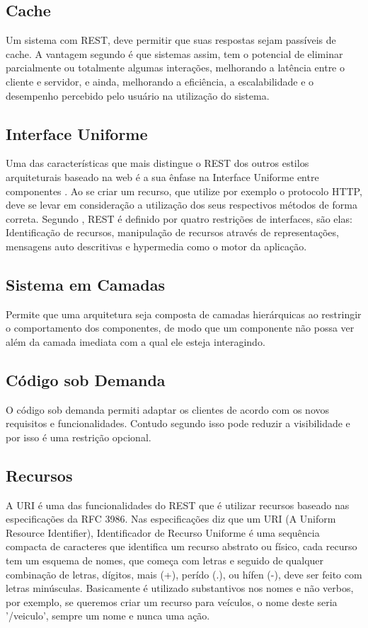 \subsection{Cache}
Um sistema com REST, deve permitir que suas respostas sejam passíveis de cache. A vantagem segundo \cite{royFielding} é que sistemas assim, tem o potencial de eliminar parcialmente ou totalmente algumas interações, melhorando a latência entre o cliente e servidor, e ainda, melhorando a eficiência, a escalabilidade e o desempenho percebido pelo usuário na utilização do sistema.

\subsection{Interface Uniforme}
Uma das características que mais distingue o REST dos outros estilos arquiteturais baseado na web é a sua ênfase na Interface Uniforme entre componentes \cite{royFielding}. Ao se criar um recurso, que utilize por exemplo o protocolo HTTP, deve se levar em consideração a utilização dos seus respectivos métodos de forma correta. Segundo \cite{royFielding}, REST é definido por quatro restrições de interfaces, são elas: Identificação de recursos, manipulação de recursos através de representações, mensagens auto descritivas e hypermedia como o motor da aplicação.

\subsection{Sistema em Camadas}
Permite que uma arquitetura seja composta de camadas hierárquicas ao restringir o comportamento dos componentes, de modo que um componente não possa ver além da camada imediata com a qual ele esteja interagindo\cite{royFielding}.

\subsection{Código sob Demanda}
O código sob demanda permiti adaptar os clientes de acordo com os novos requisitos e funcionalidades. Contudo segundo \cite{royFielding} isso pode reduzir a visibilidade e por isso é uma restrição opcional.

\subsection{Recursos}
A URI é uma das funcionalidades do REST que é utilizar recursos baseado nas especificações da RFC 3986. Nas especificações \cite{rfc3986} diz que um URI (A Uniform Resource Identifier), Identificador de Recurso Uniforme é uma sequência compacta de caracteres que identifica um recurso abstrato ou físico, cada recurso tem um esquema de nomes, que começa com letras e seguido de qualquer combinação de letras, dígitos, mais (+), perído (.), ou hífen (-), deve ser feito com letras minúsculas. Basicamente é utilizado substantivos nos nomes e não verbos, por exemplo, se queremos criar um recurso para veículos, o nome deste seria '/veiculo', sempre um nome e nunca uma ação.


